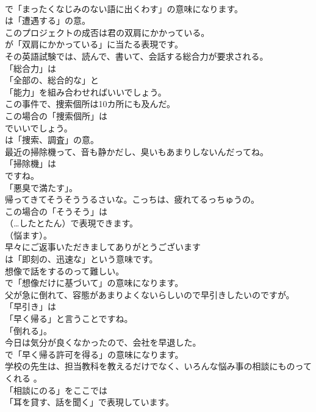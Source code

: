 \documentclass[8pt]{extreport}
\begin{document}
\begin{CJK}{UTF8}{min}
\\	で「まったくなじみのない語に出くわす」の意味になります。
\\	は「遭遇する」の意。	
\\	このプロジェクトの成否は君の双肩にかかっている。 
\\	が「双肩にかかっている」に当たる表現です。	
\\	その英語試験では、読んで、書いて、会話する総合力が要求される。 
\\	「総合力」は
\\	「全部の、総合的な」と
\\	「能力」を組み合わせればいいでしょう。	
\\	この事件で、捜索個所は10カ所にも及んだ。 
\\	この場合の「捜索個所」は
\\	でいいでしょう。
\\	は「捜索、調査」の意。	
\\	最近の掃除機って、音も静かだし、臭いもあまりしないんだってね。 
\\	「掃除機」は
\\	ですね。
\\	「悪臭で満たす」。	
\\	帰ってきてそうそううるさいな。こっちは、疲れてるっちゅうの。 
\\	この場合の「そうそう」は
\\	（…したとたん）で表現できます。
\\	（悩ます）。	
\\	早々にご返事いただきましてありがとうございます 
\\	は「即刻の、迅速な」という意味です。	
\\	想像で話をするのって難しい。 
\\	で「想像だけに基づいて」の意味になります。	
\\	父が急に倒れて、容態があまりよくないらしいので早引きしたいのですが。 
\\	「早引き」は
\\	「早く帰る」と言うことですね。
\\	「倒れる」。	
\\	今日は気分が良くなかったので、会社を早退した。 
\\	で「早く帰る許可を得る」の意味になります。	
\\	学校の先生は、担当教科を教えるだけでなく、いろんな悩み事の相談にものってくれる 。 
\\	「相談にのる」をここでは
\\	「耳を貸す、話を聞く」で表現しています。	

\end{CJK}
\end{document}

